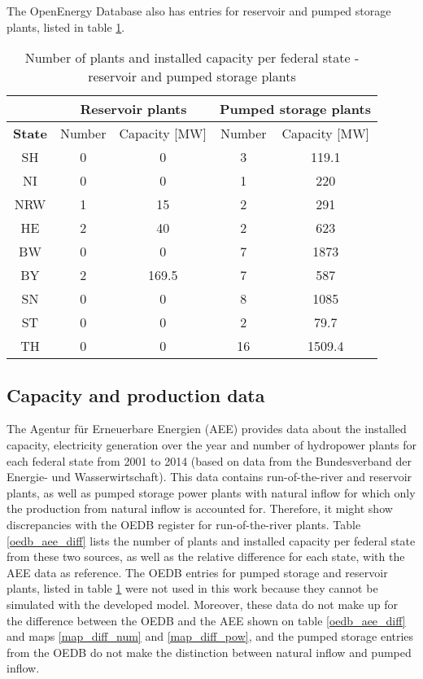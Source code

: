 The OpenEnergy Database also has entries for reservoir and pumped storage plants, listed in table \ref{oedb_pump_res}.

\begin{table}
\footnotesize
  \caption[Number of plants and installed capacity per federal state - reservoir and pumped storage plants]{Number of plants and installed capacity per federal state - reservoir and pumped storage plants \cite{oedb}}
  \centering
  \label{oedb_pump_res}
  \begin{tabular}{|c|cc|cc| }
  \cline{2-5}
  \multicolumn{0}{c|}{} &\multicolumn{2}{|c}{\textbf{Reservoir plants}}&\multicolumn{2}{|c|}{\textbf{Pumped storage plants}} \\
  \hline
  \textbf{State} & Number 	& 	Capacity [MW] 	&	Number 	& 	Capacity [MW] 	 \\
  \hline
  SH	&	0	&	0		&	3	&	119.1	\\
  NI	&	0	&	0		&	1	&	220	\\
  NRW	&	1	&	15		&	2	&	291	\\
  HE	&	2	&	40		&	2	&	623	\\
  BW	&	0	&	0		&	7	&	1873	\\	
  BY	&	2	&	169.5		&	7	&	587	\\
  SN	&	0	&	0		&	8	&	1085	\\
  ST	&	0	&	0		&	2	&	79.7	\\
  TH	&	0	&	0		&	16	&	1509.4	\\
  \hline
  \end{tabular}
\end{table}

\subsection{Capacity and production data}

The Agentur für Erneuerbare Energien (AEE) provides data about the installed capacity, electricity generation over the year and number of hydropower plants for each federal state \cite{aee} from 2001 to 2014 (based on data from the Bundesverband der Energie- und Wasserwirtschaft). This data contains run-of-the-river and reservoir plants, as well as pumped storage power plants with natural inflow for which only the production from natural inflow is accounted for. Therefore, it might show discrepancies with the OEDB register for run-of-the-river plants. Table \ref{oedb_aee_diff} lists the number of plants and installed capacity per federal state from these two sources, as well as the relative difference for each state, with the AEE data as reference. The OEDB entries for pumped storage and reservoir plants, listed in table \ref{oedb_pump_res} were not used in this work because they cannot be simulated with the developed model. Moreover, these data do not make up for the difference between the OEDB and the AEE shown on table \ref{oedb_aee_diff} and maps \ref{map_diff_num} and \ref{map_diff_pow}, and the pumped storage entries from the OEDB do not make the distinction between natural inflow and pumped inflow.

